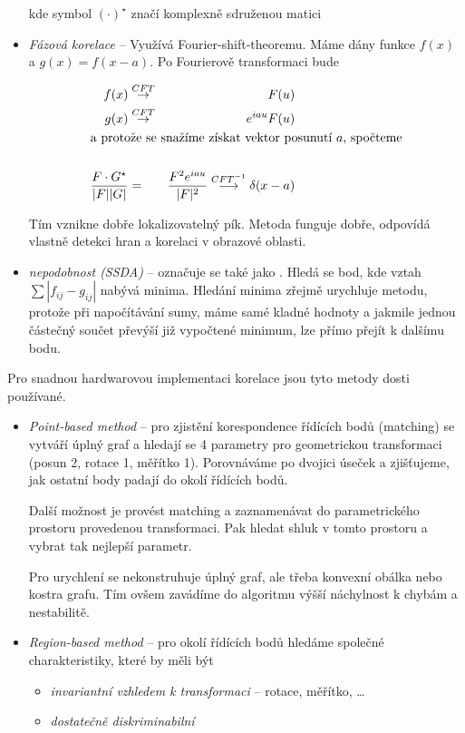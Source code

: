 \begin{itemize}
kde symbol $(\cdot)^\star$ značí komplexně sdruženou matici

\item {\em Fázová korelace} -- Využívá Fourier-shift-theoremu. Máme dány funkce $f(x)$ a $g(x)=f(x-a)$. Po Fourierově
transformaci bude

\begin{eqnarray}
f(x)&\stackrel{CFT}{\rightarrow}&F(u)\\
g(x)&\stackrel{CFT}{\rightarrow}&e^{iau}F(u)\\
\noalign{\hbox{a protože se snažíme získat vektor posunutí $a$, spočteme}\nonumber}\\
\frac{F\cdot G^\star}{|F||G|}&=&\frac{F^2e^{iau}}{|F|^2}\stackrel{CFT^{-1}}{\longrightarrow}\delta(x-a)
\end{eqnarray}

Tím vznikne dobře lokalizovatelný pík. Metoda funguje dobře, odpovídá vlastně detekci hran a korelaci v obrazové oblasti.

\item {\em nepodobnost (SSDA)} -- označuje se také jako . Hledá se bod,
 kde vztah $\sum|f_{ij}-g_{ij}|$
nabývá minima. Hledání minima zřejmě urychluje metodu, protože při napočítávání sumy, máme samé kladné hodnoty a 
jakmile jednou částečný součet převýší již vypočtené minimum, lze přímo přejít k dalšímu bodu.
\end{itemize}

Pro snadnou hardwarovou implementaci korelace jsou tyto metody dosti používané.


\begin{itemize}
\item {\em Point-based method} -- pro zjistění korespondence řídících bodů (matching) se vytváří úplný graf a hledají se 
4 parametry pro geometrickou transformaci (posun 2, rotace 1, měřítko 1). Porovnáváme po dvojici úseček a zjišťujeme,
jak ostatní body padají do okolí řídících bodů.

Další možnost je provést matching a zaznamenávat do parametrického prostoru provedenou transformaci. Pak hledat shluk
v tomto prostoru a vybrat tak nejlepší parametr.

Pro urychlení se nekonstruhuje úplný graf, ale třeba konvexní obálka nebo kostra grafu. Tím ovšem zavádíme do algoritmu výšší 
náchylnost k chybám a nestabilitě.


\item {\em Region-based method} -- pro okolí řídících bodů hledáme společné charakteristiky, které by měli být
 \begin{itemize}
  \item {\em invariantní vzhledem k transformaci} -- rotace, měřítko, \dots
  \item {\em dostatečně diskriminabilní} 
 \end{itemize}
\end{itemize}

